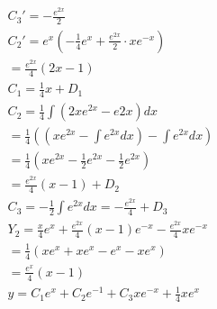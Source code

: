 \documentclass{jsarticle}
\begin{document}
\begin{eqnarray}
C_3'=-\frac{e^{2x}}{2}\\
C_2'=e^x\left(-\frac{1}{4}e^x+\frac{e^{2x}}{2}\cdot xe^{-x}\right)\\
=\frac{e^{2x}}{4}(2x-1)\\
C_1=\frac{1}{4}x+D_1\\
C_2=\frac{1}{4}\int (2xe^{2x}-e{2x})dx\\
=\frac{1}{4}\left(\left(xe^{2x}-\int e^{2x}dx\right)-\int e^{2x}dx\right)\\
=\frac{1}{4}(xe^{2x}-\frac{1}{2}e^{2x}-\frac{1}{2}e^{2x})\\
=\frac{e^{2x}}{4}(x-1)+D_2\\
C_3=-\frac{1}{2}\int e^{2x}dx=-\frac{e^{2x}}{4}+D_3\\
Y_2=\frac{x}{4}e^x+\frac{e^{2x}}{4}(x-1)e^{-x}-\frac{e^{2x}}{4}xe^{-x}\\
=\frac{1}{4}(xe^x+xe^x-e^x-xe^x)\\
=\frac{e^x}{4}(x-1)\\
y=C_1e^x+C_2e^{-1}+C_3xe^{-x}+\frac{1}{4}xe^x
\end{eqnarray}
\clearpage
\end{document}
